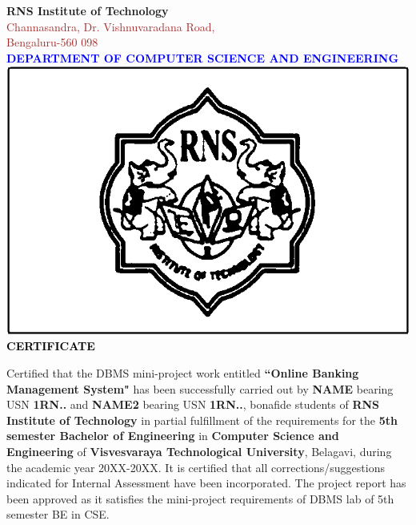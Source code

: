 \begin{titlepage}
\begin{center}
\break\break
\textup{\large {\textcolor{darkbrown}{\bf RNS Institute of Technology}} \\ 
{\normalsize{\textcolor{brown}{Channasandra, Dr. Vishnuvaradana Road,\\ Bengaluru-560 098}}}}\\[0.1in]
\textup{\normalsize {\textcolor{blue}{\bf DEPARTMENT OF COMPUTER SCIENCE AND ENGINEERING}}}\\[0.1in]
\includegraphics{./RNSIT.jpg}\break\break
\textup{\Large {\textcolor{black}{\textbf {CERTIFICATE}}}} \\[0.1cm]
\end{center}
\raggedright{
\textup{\hspace{0.5in} Certified that the DBMS mini-project work entitled {\textbf{``Online Banking Management System"}} has been successfully carried out by {\textbf{NAME}} bearing USN {\textbf{1RN..}} and {\textbf{NAME2}} bearing USN {\textbf{1RN..}}, bonafide students of {\textbf{RNS Institute of Technology }} in partial fulfillment of the requirements for the {\textbf{5th semester Bachelor of Engineering}} in {\textbf{Computer Science and Engineering}} of {\textbf{Visvesvaraya Technological University}}, Belagavi, during the academic year 20XX-20XX. It is certified that all corrections/suggestions indicated for Internal Assessment have been incorporated. The project report has been approved as it satisfies the mini-project requirements of DBMS lab of 5th semester BE in CSE.}\\[0.7in]
}
\end{titlepage}
